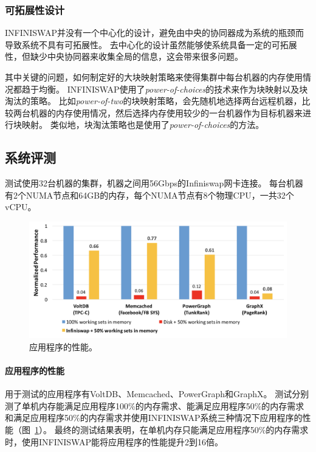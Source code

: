 \subsubsection{可拓展性设计}
INFINISWAP并没有一个中心化的设计，避免由中央的协同器成为系统的瓶颈而导致系统不具有可拓展性。
去中心化的设计虽然能够使系统具备一定的可拓展性，但缺少中央协同器来收集全局的信息，这会带来很多问题。

其中关键的问题，如何制定好的大块映射策略来使得集群中每台机器的内存使用情况都趋于均衡。
INFINISWAP使用了\emph{power-of-choices}的技术来作为块映射以及块淘汰的策略。
比如\emph{power-of-two}的块映射策略，会先随机地选择两台远程机器，比较两台机器的内存使用情况，然后选择内存使用较少的一台机器作为目标机器来进行块映射。
类似地，块淘汰策略也是使用了\emph{power-of-choices}的方法。

\subsection{系统评测}
测试使用32台机器的集群，机器之间用56Gbps的Infiniswap网卡连接。
每台机器有2个NUMA节点和64GB的内存，每个NUMA节点有8个物理CPU，一共32个vCPU。

\begin{figure}
\centering
\includegraphics[scale=0.4]{Figures/memory/infiniswap_evaluation1.png}
\decoRule
\caption{应用程序的性能\cite{gu2017efficient}。}
\label{fig:infiniswap_evaluation1}
\end{figure}

\paragraph{应用程序的性能}
用于测试的应用程序有VoltDB、Memcached、PowerGraph和GraphX。
测试分别测了单机内存能满足应用程序100\%的内存需求、能满足应用程序50\%的内存需求和满足应用程序50\%的内存需求并使用INFINISWAP系统三种情况下应用程序的性能（图~\ref{fig:infiniswap_evaluation1}）。
最终的测试结果表明，在单机内存只能满足应用程序50\%的内存需求时，使用INFINISWAP能将应用程序的性能提升2到16倍。

